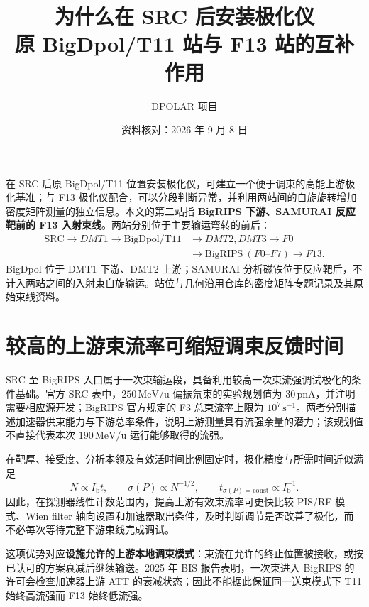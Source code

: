 \documentclass[UTF8,11pt,a4paper,fontset=none]{ctexart}
\title{\sffamily\color{ink}为什么在 SRC 后安装极化仪\\[4pt]
\large 原 BigDpol/T11 站与 F13 站的互补作用}
\author{DPOLAR 项目}
\date{资料核对：2026 年 9 月 8 日}
\begin{document}
\maketitle
\thispagestyle{empty}
\noindent
在 SRC 后原 BigDpol/T11 位置安装极化仪，可建立一个便于调束的高能上游极化基准；与 F13 极化仪配合，可以分段判断异常，并利用两站间的自旋旋转增加密度矩阵测量的独立信息。本文的第二站指 \textbf{BigRIPS 下游、SAMURAI 反应靶前的 F13 入射束线}。两站分别位于主要输运弯转的前后：
\begin{equation*}
\begin{aligned}
\mathrm{SRC}\to DMT1\to
\boxed{\mathrm{BigDpol/T11}}&\to DMT2,DMT3\to F0\\[-1pt]
&\to\mathrm{BigRIPS}\ (F0\text{--}F7)\to\boxed{F13}.
\end{aligned}
\end{equation*}
BigDpol 位于 DMT1 下游、DMT2 上游；SAMURAI 分析磁铁位于反应靶后，不计入两站之间的入射束自旋输运。站位与几何沿用仓库的密度矩阵专题记录及其原始束线资料\cite{local,geometry}。

\section{较高的上游束流率可缩短调束反馈时间}

SRC 至 BigRIPS 入口属于一次束输运段，具备利用较高一次束流强调试极化的条件基础。官方 SRC 表中，$250\,\mathrm{MeV/u}$ 偏振氘束的实验规划值为 $30\,\mathrm{pnA}$，并注明需要相应源开发；BigRIPS 官方规定的 F3 总束流率上限为 $10^7\,\mathrm{s^{-1}}$\cite{current,limit}。两者分别描述加速器供束能力与下游总率条件，说明上游测量具有流强余量的潜力；该规划值不直接代表本次 $190\,\mathrm{MeV/u}$ 运行能够取得的流强。

在靶厚、接受度、分析本领及有效活时间比例固定时，极化精度与所需时间近似满足
\begin{equation}
 N\propto I_{\mathrm b}t,\qquad
 \sigma(P)\propto N^{-1/2},\qquad
 t_{\sigma(P)=\mathrm{const}}\propto I_{\mathrm b}^{-1}.
\end{equation}
因此，在探测器线性计数范围内，提高上游有效束流率可更快比较 PIS/RF 模式、Wien filter 轴向设置和加速器取出条件，及时判断调节是否改善了极化，而不必每次等待完整下游束线完成调试。

这项优势对应\textbf{设施允许的上游本地调束模式}：束流在允许的终止位置被接收，或按已认可的方案衰减后继续输送。2025 年 BIS 报告表明，一次束进入 BigRIPS 的许可会检查加速器上游 ATT 的衰减状态\cite{bis}；因此不能据此保证同一送束模式下 T11 始终高流强而 F13 始终低流强。
\end{document}
